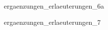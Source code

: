 \cppb
\begin{tcolorbox}[colframe=white,coltitle=white,title={}]
	{ergaenzungen_erlaeuterungen_6a}
\end{tcolorbox}
\cppb
\begin{tcolorbox}[colframe=SGL2,coltitle=white,title={}]
	{ergaenzungen_erlaeuterungen_7}
\end{tcolorbox}
\cppb
